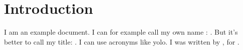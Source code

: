 \section{Introduction}

I am an example document.
I can for example call my own name : \docname. %
But it's better to call my title: \doctitle. %
I can use acronyms like \gls{yolo}. %
I was written by \docauthor, for \cite{marge}. %